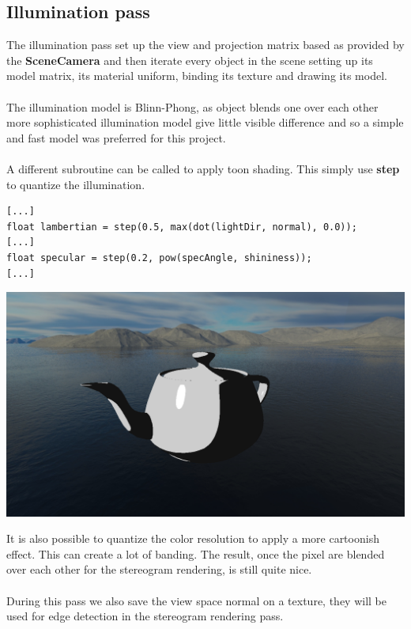\documentclass[12pt, a4paper]{article}
\begin{document}
\subsection{Illumination pass}
The illumination pass set up the view and projection matrix based as provided by the \textbf{SceneCamera} and then iterate
every object in the scene setting up its model matrix, its material uniform, binding its texture and drawing its model.\\\\
The illumination model is Blinn-Phong, as object blends one over each other more sophisticated illumination model give little
visible difference and so a simple and fast model was preferred for this project.\\\\
A different subroutine can be called to apply toon shading. This simply use \textbf{step} to quantize the illumination.
\begin{lstlisting}[caption={Toon shading subroutine version},captionpos=b]
[...]
float lambertian = step(0.5, max(dot(lightDir, normal), 0.0));
[...]
float specular = step(0.2, pow(specAngle, shininess));
[...]
\end{lstlisting}
\begin{center}
    \centering
    \includegraphics[width=1.0\textwidth]{img/toon.png}
\end{center}
It is also possible to quantize the color resolution to apply a more cartoonish effect. This can create a lot
of banding. The result, once the pixel are blended over each other for the stereogram rendering, is still quite nice.\\\\
During this pass we also save the view space normal on a texture, they will be used for edge detection in the stereogram
rendering pass.
\end{document}
